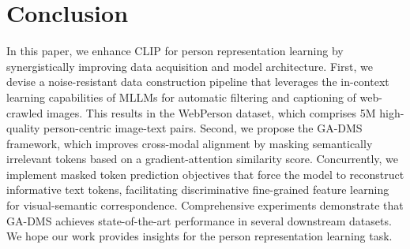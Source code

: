 \section*{Conclusion}
In this paper, we enhance CLIP for person representation learning by synergistically improving data acquisition and model architecture. First, we devise a noise-resistant data construction pipeline that leverages the in-context learning capabilities of MLLMs for automatic filtering and captioning of web-crawled images. This results in the WebPerson dataset, which comprises 5M high-quality person-centric image-text pairs. Second, we propose the GA-DMS framework, which improves cross-modal alignment by masking semantically irrelevant tokens based on a gradient-attention similarity score. Concurrently, we implement masked token prediction objectives that force the model to reconstruct informative text tokens, facilitating discriminative fine-grained feature learning for visual-semantic correspondence. Comprehensive experiments demonstrate that GA-DMS achieves state-of-the-art performance in several downstream datasets. We hope our work provides insights for the person representation learning task.